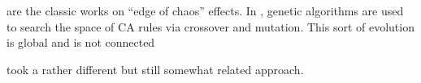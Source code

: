 \cite{langton1990computation,mitchell1993revisiting,packard1988adaptation}
are the classic works on ``edge of chaos'' effects.  In
\cite{packard1988adaptation,mitchell1993revisiting,mitchell1994evolving},
genetic algorithms are used to search the space of CA rules
via crossover and mutation.  This sort of evolution is global and
is not connected

\cite{hofstadter1995prolegomena,marshall1999metacat} took a rather
different but still somewhat related approach.

\cite{goerg2012licors,goerg2012mixed}
